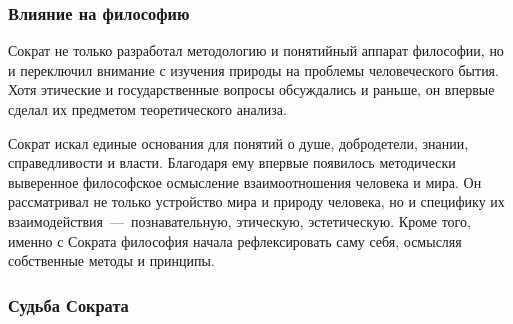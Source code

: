 \subsubsection{Влияние на философию}


Сократ не только разработал методологию и понятийный аппарат философии, но и переключил внимание с изучения природы на проблемы человеческого бытия. Хотя этические и государственные вопросы обсуждались и раньше, он впервые сделал их предметом теоретического анализа.

Сократ искал единые основания для понятий о душе, добродетели, знании, справедливости и власти. Благодаря ему впервые появилось методически выверенное философское осмысление взаимоотношения человека и мира. Он рассматривал не только устройство мира и природу человека, но и специфику их взаимодействия~---~познавательную, этическую, эстетическую. Кроме того, именно с Сократа философия начала рефлексировать саму себя, осмысляя собственные методы и принципы.

\subsubsection{Судьба Сократа}

